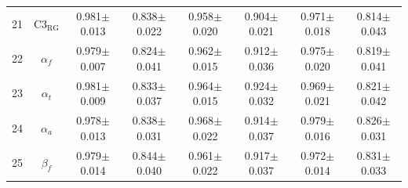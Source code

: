 \documentclass[pdflatex,sn-mathphys]{sn-jnl}%
\theoremstyle{thmstyleone}%
\theoremstyle{thmstyletwo}%
\theoremstyle{thmstylethree}%
\begin{document}
\begin{appendices}
\begin{table}[h!]
{\begin{tabular}{r|ccccccc}
  21 &         $\text{C3}_{\text{RG}}$ &          0.981$\pm$0.013 &          0.838$\pm$0.022 &          0.958$\pm$0.020 &          0.904$\pm$0.021 &          0.971$\pm$0.018 &          0.814$\pm$0.043 \\
  22 &                    $\alpha_{f}$ &          0.979$\pm$0.007 &          0.824$\pm$0.041 &          0.962$\pm$0.015 &          0.912$\pm$0.036 &          0.975$\pm$0.020 &          0.819$\pm$0.041 \\
  23 &                    $\alpha_{t}$ &          0.981$\pm$0.009 &          0.833$\pm$0.037 &          0.964$\pm$0.015 &          0.924$\pm$0.032 &          0.969$\pm$0.021 &          0.821$\pm$0.042 \\
  24 &                    $\alpha_{a}$ &          0.978$\pm$0.013 &          0.838$\pm$0.031 &          0.968$\pm$0.022 &          0.914$\pm$0.037 &          0.979$\pm$0.016 &          0.826$\pm$0.031 \\
  25 &                     $\beta_{f}$ &          0.979$\pm$0.014 &          0.844$\pm$0.040 &          0.961$\pm$0.022 &          0.917$\pm$0.037 &          0.972$\pm$0.014 &          0.831$\pm$0.033 \\
\hline
\end{tabular}
}
\end{table}



\end{appendices}
\end{document}
